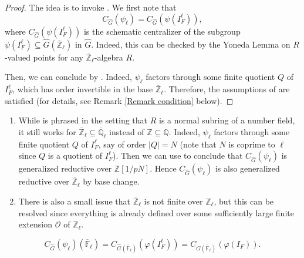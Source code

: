 \begin{proof}
	The idea is to invoke \cite[Lemma 3.2]{dat2022ihes}. We first note that $$C_{\hat{G}}(\psi_{\ell})=C_{\hat{G}}(\psi(I_F^{\ell})),$$
	where $C_{\hat{G}}(\psi(I_F^{\ell}))$ is the schematic centralizer of the subgroup $\psi(I_F^{\ell}) \subseteq \hat{G}(\overline{\mathbb{Z}}_{\ell})$ in $\hat{G}$. Indeed, this can be checked by the Yoneda Lemma on $R$-valued points for any $\overline{\mathbb{Z}}_{\ell}$-algebra $R$.
	
	Then, we can conclude by \cite[Lemma 3.2]{dat2022ihes}. Indeed, $\psi_{\ell}$ factors through some finite quotient $Q$ of $I_F^{\ell}$, which has order invertible in the base $\overline{\mathbb{Z}}_{\ell}$. Therefore, the assumptions of \cite[Lemma 3.2]{dat2022ihes} are satisfied (for details, see Remark \ref{Remark condition} below). 
\end{proof}

\begin{remark}\label{Remark condition}
	\begin{enumerate}
		\item While \cite[Lemma 3.2]{dat2022ihes} is phrased in the setting that $R$ is a normal subring of a number field, it still works for $\overline{\mathbb{Z}}_{\ell} \subseteq \overline{\mathbb{Q}}_{\ell}$ instead of $\mathbb{Z} \subseteq \mathbb{Q}$. Indeed, $\psi_{\ell}$ factors through some finite quotient $Q$ of $I_F^{\ell}$, say of order $|Q|=N$ (note that $N$ is coprime to $\ell$ since $Q$ is a quotient of $I_F^{\ell}$). Then we can use \cite[Lemma 3.2]{dat2022ihes} to conclude that $C_{\hat{G}}(\psi_{\ell})$ is generalized reductive over $\mathbb{Z}[1/pN]$. Hence $C_{\hat{G}}(\psi_{\ell})$ is also generalized reductive over $\overline{\mathbb{Z}}_{\ell}$ by base change.
		\item There is also a small issue that $\overline{\mathbb{Z}}_{\ell}$ is not finite over $\mathbb{Z}_{\ell}$, but this can be resolved since everything is already defined over some sufficiently large finite extension $\mathcal{O}$ of $\mathbb{Z}_{\ell}$.
	\end{enumerate}
\end{remark}

\begin{lemma}\label{Lem I_F^ell}
	$$C_{\hat{G}}(\psi_{\ell})(\overline{\mathbb{F}}_{\ell})=C_{\hat{G}(\overline{\mathbb{F}}_{\ell})}(\varphi(I_F^\ell))=C_{\hat{G}(\overline{\mathbb{F}}_{\ell})}(\varphi(I_F)).$$
\end{lemma}


